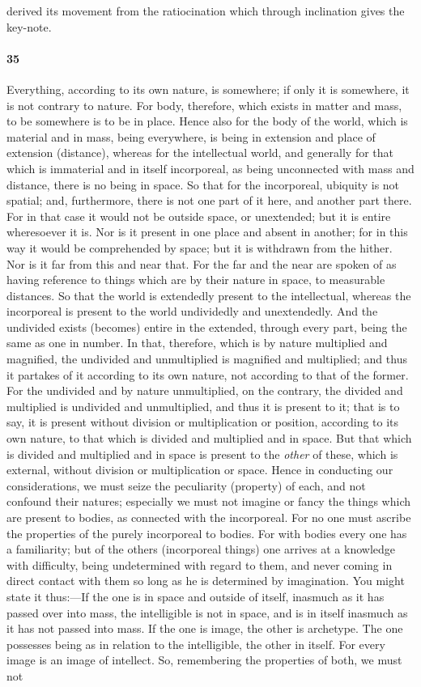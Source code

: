 \documentclass[12pt]{article}
\begin{document}
derived its movement from the ratiocination which through inclination gives the key-note.

\paragraph{35} Everything, according to its own nature, is somewhere; if only it is somewhere, it is not contrary to nature. For body, therefore, which exists in matter and mass, to be somewhere is to be in place. Hence also for the body of the world, which is material and in mass, being everywhere, is being in extension and place of extension (distance), whereas for the intellectual world, and generally for that which is immaterial and in itself incorporeal, as being unconnected with mass and distance, there is no being in space. So that for the incorporeal, ubiquity is not spatial; and, furthermore, there is not one part of it here, and another part there. For in that case it would not be outside space, or unextended; but it is entire wheresoever it is. Nor is it present in one place and absent in another; for in this way it would be comprehended by space; but it is withdrawn from the hither. Nor is it far from this and near that. For the far and the near are spoken of as having reference to things which are by their nature in space, to measurable distances. So that the world is extendedly present to the intellectual, whereas the incorporeal is present to the world undividedly and unextendedly. And the undivided exists (becomes) entire in the extended, through every part, being the same as one in number. In that, therefore, which is by nature multiplied and magnified, the undivided and unmultiplied is magnified and multiplied; and thus it partakes of it according to its own nature, not according to that of the former. For the undivided and by nature unmultiplied, on the contrary, the divided and multiplied is undivided and unmultiplied, and thus it is present to it; that is to say, it is present without division or multiplication or position, according to its own nature, to that which is divided and multiplied and in space. But that which is divided and multiplied and in space is present to the \textit{other} of these, which is external, without division or multiplication or space. Hence in conducting our considerations, we must seize the peculiarity (property) of each, and not confound their natures; especially we must not imagine or fancy the things which are present to bodies, as connected with the incorporeal. For no one must ascribe the properties of the purely incorporeal to bodies. For with bodies every one has a familiarity; but of the others (incorporeal things) one arrives at a knowledge with difficulty, being undetermined with regard to them, and never coming in direct contact with them so long as he is determined by imagination. You might state it thus:---If the one is in space and outside of itself, inasmuch as it has passed over into mass, the intelligible is not in space, and is in itself inasmuch as it has not passed into mass. If the one is image, the other is archetype. The one possesses being as in relation to the intelligible, the other in itself. For every image is an image of intellect. So, remembering the properties of both, we must not 
\end{document}
